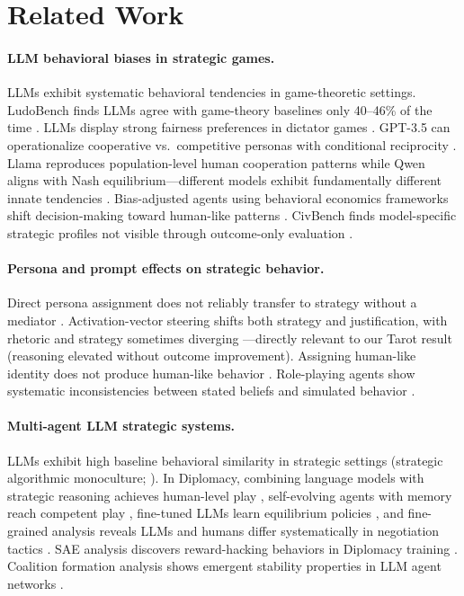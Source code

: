 \documentclass[11pt]{article}
\begin{document}
\section{Related Work}
\label{sec:related}

\paragraph{LLM behavioral biases in strategic games.}
LLMs exhibit systematic behavioral tendencies in game-theoretic settings. LudoBench finds LLMs agree with game-theory baselines only 40--46\% of the time \citep{Jain2026ludobench}. LLMs display strong fairness preferences in dictator games \citep{Einwiller2025dictator}. GPT-3.5 can operationalize cooperative vs.\ competitive personas with conditional reciprocity \citep{Phelps2023psychology}. Llama reproduces population-level human cooperation patterns while Qwen aligns with Nash equilibrium---different models exhibit fundamentally different innate tendencies \citep{CeraPalatsi2025cooperation}. Bias-adjusted agents using behavioral economics frameworks shift decision-making toward human-like patterns \citep{Kitadai2025bias}. CivBench finds model-specific strategic profiles not visible through outcome-only evaluation \citep{Chen2026civbench}.

\paragraph{Persona and prompt effects on strategic behavior.}
Direct persona assignment does not reliably transfer to strategy without a mediator \citep{Licato2025persona}. Activation-vector steering shifts both strategy and justification, with rhetoric and strategy sometimes diverging \citep{Sun2026persona}---directly relevant to our Tarot result (reasoning elevated without outcome improvement). Assigning human-like identity does not produce human-like behavior \citep{Ma2024behavioral}. Role-playing agents show systematic inconsistencies between stated beliefs and simulated behavior \citep{Mannekote2025roleplaying}.

\paragraph{Multi-agent LLM strategic systems.}
LLMs exhibit high baseline behavioral similarity in strategic settings (strategic algorithmic monoculture; \citealt{Ballestero2026monoculture}). In Diplomacy, combining language models with strategic reasoning achieves human-level play \citep{Bakhtin2022diplomacy}, self-evolving agents with memory reach competent play \citep{Guan2024richelieu}, fine-tuned LLMs learn equilibrium policies \citep{Xu2025dipllm}, and fine-grained analysis reveals LLMs and humans differ systematically in negotiation tactics \citep{Li2025negotiation}. SAE analysis discovers reward-hacking behaviors in Diplomacy training \citep{Yan2026interpretability}. Coalition formation analysis shows emergent stability properties in LLM agent networks \citep{Guo2026coalition}.
\end{document}
